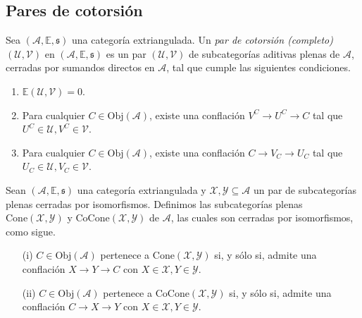 \documentclass[tesis]{subfiles}
\begin{document}
\subsection*{Pares de cotorsión} \label{Ssec: Pares de cotorsión}

\begin{Def}\cite[Definition 4.1]{NakaokaPalu}\label{NakaokaPalu-4.1}
    Sea $(\mathscr{A},\mathbb{E},\mathfrak{s})$ una categoría extriangulada. Un \emph{par de cotorsión (completo)} $(\mathcal{U},\mathcal{V})$ en $(\mathscr{A},\mathbb{E},\mathfrak{s})$ es un par $(\mathcal{U},\mathcal{V})$ de subcategorías aditivas plenas de $\mathscr{A}$, cerradas por sumandos directos en $\mathscr{A}$, tal que cumple las siguientes condiciones.

    \begin{enumerate}[label=(\alph*)]

        \item $\mathbb{E}(\mathcal{U},\mathcal{V}) = 0$.

        \item Para cualquier $C\in\text{Obj}(\mathscr{A})$, existe una conflación $V^C\to U^C\to C$ tal que $U^C\in\mathcal{U}, V^C\in \mathcal{V}$. 

        \item Para cualquier $C\in\text{Obj}(\mathscr{A})$, existe una conflación $C\to V_C\to U_C$ tal que $U_C\in\mathcal{U}, V_C\in \mathcal{V}$. 
    \end{enumerate}
\end{Def}

\begin{Def}\cite[Definition 4.2]{NakaokaPalu}\label{NakaokaPalu-4.2}
    Sean $(\mathscr{A},\mathbb{E},\mathfrak{s})$ una categoría extriangulada y $\mathcal{X},\mathcal{Y}\subseteq\mathscr{A}$ un par de subcategorías plenas cerradas por isomorfismos. Definimos las subcategorías plenas $\text{Cone}(\mathcal{X},\mathcal{Y})$ y $\text{CoCone}(\mathcal{X},\mathcal{Y})$ de $\mathscr{A}$, las cuales son cerradas por isomorfismos, como sigue.

    \begin{enumerate}
    
        \item[(i)] $C\in\text{Obj}(\mathscr{A})$ pertenece a $\text{Cone}(\mathcal{X},\mathcal{Y})$ si, y sólo si, admite una conflación $X\to Y\to C$ con $X\in \mathcal{X}, Y\in \mathcal{Y}$.

        \item[(ii)] $C\in\text{Obj}(\mathscr{A})$ pertenece a $\text{CoCone}(\mathcal{X},\mathcal{Y})$ si, y sólo si, admite una conflación $C\to X\to Y$ con $X\in \mathcal{X}, Y\in \mathcal{Y}$.
    \end{enumerate}
\end{Def}
\end{document}
